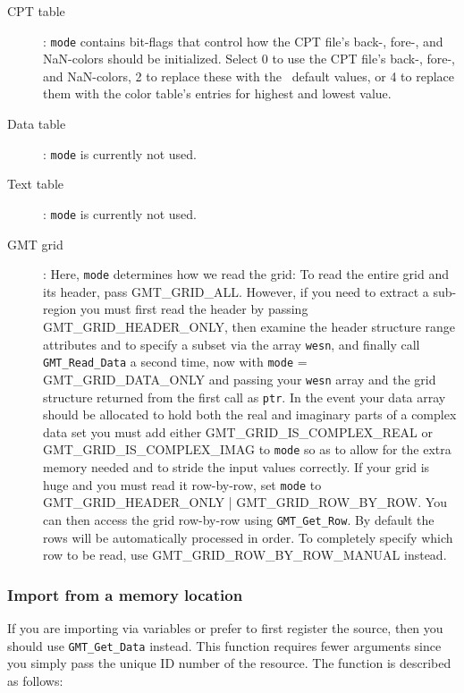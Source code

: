 \documentclass[11pt]{report}
\begin{document}
\begin{description}
\item [CPT table]:  \texttt{mode} contains bit-flags that control how the CPT file's back-, fore-, and NaN-colors
should be initialized.  Select 0 to use the CPT file's back-, fore-, and NaN-colors, 2
to replace these with the \GMT\ default values, or 4 to replace them with the color table's
entries for highest and lowest value.
\item [Data table]:  \texttt{mode} is currently not used.
\item [Text table]:  \texttt{mode} is currently not used.
\item [GMT grid]:  Here, \texttt{mode} determines how we read the grid:
To read the entire grid and its header, pass GMT\_GRID\_ALL.  However, if you
need to extract a sub-region you must first read the header by passing
GMT\_GRID\_HEADER\_ONLY, then examine the header structure range attributes and
to specify a subset via the array \texttt{wesn}, and finally call
\texttt{GMT\_Read\_Data} a second time, now with \texttt{mode} = GMT\_GRID\_DATA\_ONLY and passing your \texttt{wesn} array
and the grid structure returned from the first call as \texttt{ptr}.
In the event your data array should be allocated to hold both the real and imaginary parts of a
complex data set you must add either GMT\_GRID\_IS\_COMPLEX\_REAL or GMT\_GRID\_IS\_COMPLEX\_IMAG to \texttt{mode}
so as to allow for the extra memory needed and to stride the input values correctly.
If your grid is huge and you must read it row-by-row, set \texttt{mode} to
GMT\_GRID\_HEADER\_ONLY | GMT\_GRID\_ROW\_BY\_ROW.  You can then access the grid row-by-row
using \texttt{GMT\_Get\_Row}.  By default the rows will be automatically
processed in order.  To completely specify which row to be read, use GMT\_GRID\_ROW\_BY\_ROW\_MANUAL
instead.
\end{description}

\subsubsection{Import from a memory location}

If you are importing via variables or prefer to first register the source, then you
should use \texttt{GMT\_Get\_Data} instead.  This function requires fewer arguments since you simply
pass the unique ID number of the resource.  The function is described as follows:
\end{document}
